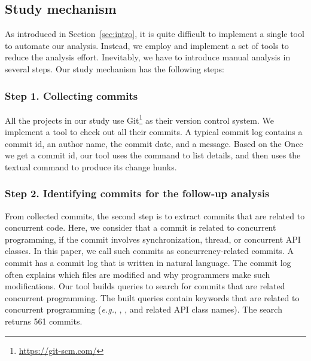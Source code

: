 \subsection{Study mechanism}
\label{sec:method:tool}
As introduced in Section~\ref{sec:intro}, it is quite difficult to implement a single tool to automate our analysis. Instead, we employ and implement a set of tools to reduce the analysis effort. Inevitably, we have to introduce manual analysis in several steps. Our study mechanism has the following steps:

\subsubsection{Step 1. Collecting commits} All the projects in our study use Git\footnote{\url{https://git-scm.com/}} as their version control system. We implement a tool to check out all their commits. A typical commit log contains a commit id, an author name, the commit date, and a message. Based on the Once we get a commit id, our tool uses the  command to list details, and then uses the textual  command to produce its change hunks.

\subsubsection{Step 2. Identifying commits for the follow-up analysis} From collected commits, the second step is to extract commits that are related to concurrent code. Here, we consider that a commit is related to concurrent programming, if the commit involves synchronization, thread, or concurrent API classes. In this paper, we call such commits as concurrency-related commits. A commit has a commit log that is written in natural language. The commit log often explains which files are modified and why programmers make such modifications. Our tool builds queries to search for commits that are related concurrent programming. The built queries contain keywords that are related to concurrent programming (\emph{e.g.}, , , and related API class names). The search returns 561 commits.

